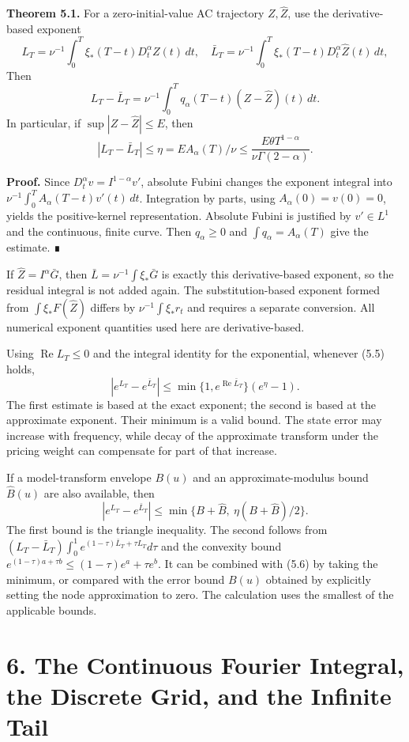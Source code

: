 \documentclass[a4paper,11pt]{article}
\begin{document}
\textbf{Theorem 5.1.} For a zero-initial-value AC trajectory \(Z,\widehat Z\), use the derivative-based exponent
\[
L_T=\nu^{-1}\int_0^T\xi_*(T-t)D_t^\alpha Z(t)\,dt,\quad
\bar L_T=\nu^{-1}\int_0^T\xi_*(T-t)D_t^\alpha\widehat Z(t)\,dt,
\]
Then
\[
L_T-\bar L_T=\nu^{-1}\int_0^Tq_\alpha(T-t)(Z-\widehat Z)(t)\,dt.
\tag{5.4}
\]
In particular, if \(\sup|Z-\widehat Z|\le E\), then
\[
|L_T-\bar L_T|\le\eta=E A_\alpha(T)/\nu
\le\frac{E\theta T^{1-\alpha}}{\nu\Gamma(2-\alpha)}.
\tag{5.5}
\]

\textbf{Proof.} Since \(D_t^\alpha v=I^{1-\alpha}v'\), absolute Fubini changes the exponent integral into
\(\nu^{-1}\int_0^TA_\alpha(T-t)v'(t)\,dt\).
Integration by parts, using \(A_\alpha(0)=v(0)=0\), yields the positive-kernel representation. Absolute Fubini is justified by \(v'\in L^1\) and the continuous, finite curve. Then \(q_\alpha\ge0\) and \(\int q_\alpha=A_\alpha(T)\) give the estimate. ∎

If \(\widehat Z=I^\alpha\bar G\), then \(\bar L=\nu^{-1}\int\xi_*\bar G\) is exactly this derivative-based exponent, so the residual integral is not added again. The substitution-based exponent formed from \(\int\xi_*F(\widehat Z)\) differs by \(\nu^{-1}\int\xi_*r_t\) and requires a separate conversion. All numerical exponent quantities used here are derivative-based.

Using \(\operatorname{Re}L_T\le0\) and the integral identity for the exponential, whenever (5.5) holds,
\[
|e^{L_T}-e^{\bar L_T}|
\le\min\{1,e^{\operatorname{Re}\bar L_T}\}(e^\eta-1).
\tag{5.6}
\]
The first estimate is based at the exact exponent; the second is based at the approximate exponent. Their minimum is a valid bound. The state error may increase with frequency, while decay of the approximate transform under the pricing weight can compensate for part of that increase.

If a model-transform envelope \(B(u)\) and an approximate-modulus bound \(\widehat B(u)\) are also available, then
\[
|e^{L_T}-e^{\bar L_T}|
\le\min\{B+\widehat B,\ \eta(B+\widehat B)/2\}.
\tag{5.7}
\]
The first bound is the triangle inequality. The second follows from
\((L_T-\bar L_T)\int_0^1e^{(1-\tau)\bar L_T+\tau L_T}d\tau\)
and the convexity bound \(e^{(1-\tau)a+\tau b}\le(1-\tau)e^a+\tau e^b\). It can be combined with (5.6) by taking the minimum, or compared with the error bound \(B(u)\) obtained by explicitly setting the node approximation to zero. The calculation uses the smallest of the applicable bounds.

\section*{6. The Continuous Fourier Integral, the Discrete Grid, and the Infinite Tail}
\end{document}
